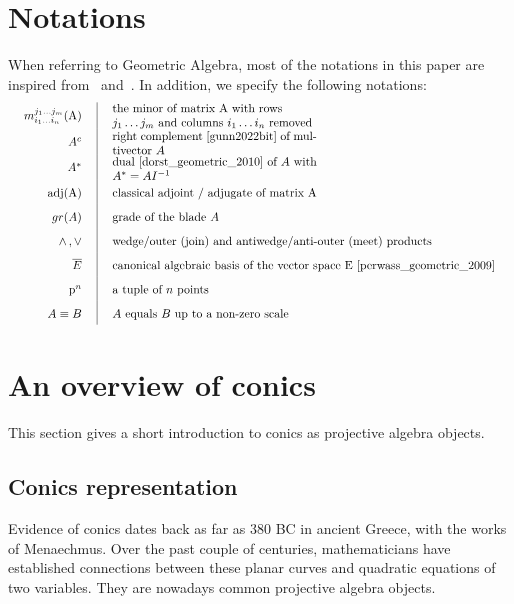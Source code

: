 \documentclass{birkjour}
\begin{document}
\section{Notations}
\label{sec:notations}
When referring to Geometric Algebra, most of the notations in this paper are inspired from~\cite{dorst_geometric_2010} and~\cite{perwass_geometric_2009}. In addition, we specify the following notations:
\begin{equation*}
\def\arraystretch{1.7}
\setlength\arraycolsep{3ex}
\begin{array}{r|l}
    m_{i_1 \dots i_n}^{j_1 \dots j_m}(\mathrm{A}) &\parbox{\linewidth/2}{the minor of matrix A with rows \\
    \(j_1 \dots j_m\) and columns \(i_1 \dots i_n\) removed} \\
    A^c & \parbox{0.5\linewidth}{right complement~\cite{gunn2022bit} of multivector \(A\)} \\ 
    A^* & \parbox{0.5\linewidth}{dual~\cite{dorst_geometric_2010} of $A$ with \(A^*= A I^{-1}\)} \\
    \mbox{adj}(\mathrm{A}) & \parbox{0.5\linewidth}{classical adjoint / adjugate of matrix~\(\mathrm{A}\)} \\
    gr(A) & \mbox{grade of the blade \(A\)} \\
    \wedge\,, \vee & \mbox{wedge/outer (join) and antiwedge/anti-outer (meet) products} \\
    \overline{E} & \mbox{canonical algebraic basis of the vector space E~\cite{perwass_geometric_2009}}\\
    \mathrm{p}^n & \mbox{a tuple of \(n\) points} \\
    A \equiv B & \mbox{\(A\) equals \(B\) up to a non-zero scale}
\end{array}
\end{equation*}

\section{An overview of conics}
\label{sec:State_of_the_art}
This section gives a short introduction to conics as projective algebra objects.

\subsection{Conics representation}
\label{sec:conic-representation}
Evidence of conics dates back as far as 380 BC in ancient Greece, with the works of Menaechmus. Over the past couple of centuries, mathematicians have established connections between these planar curves and quadratic equations of two variables. They are nowadays common projective algebra objects.
\end{document}
